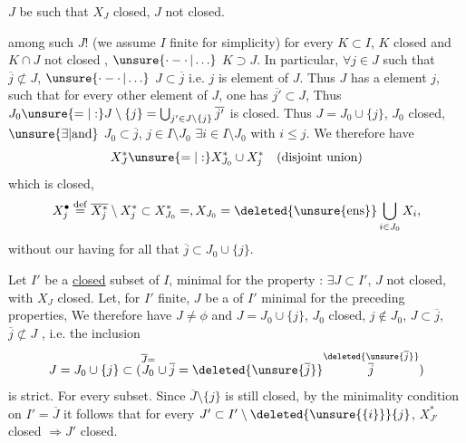   $J$ be such that $X_J$ closed, $J$ not closed. 

among such $J$! (we assume $I$ finite for simplicity) 
for every $K\subset I$, $K$ closed and $K\cap J$ not closed , $\unsure{\mathinner{\cdot-\cdot}|\ldots}$ $K\supset J$.
In particular, $\forall j\in J$ such that $\overline j\not\subset J$, $\unsure{\mathinner{\cdot-\cdot}|\ldots}$ $J\subset\overline j$
i.e. $j$ is  element of $J$. Thus $J$ has a 
element $j$, such that for every other element  of $J$, one has
$\overline{j'}\subset J$, Thus 
$J_0\unsure{=|:}J\setminus\{j\}=\bigcup_{j'\in J\setminus\{j\}}\overline{j'}$ is closed.
Thus $J=J_0\cup\{j\}$, $J_0$ closed, $\unsure{\exists|\mathrm{and}}$ $J_0\subset\overline j$, $j\in I\setminus J_0$
$\exists i\in I\setminus J_0$ with $i\leq j$.  We therefore have
\[
X_J^*\unsure{=|:}X_{J_0}^*\cup X_j^*\quad(\text{disjoint union})
\]
which is closed, 
\[
X_j^\bullet\overset{\mathrm{def}}=\overline{X_j^*}\setminus X_j^*\subset X_{J_0}^*=,X_{J_0}=\deleted{\unsure{\mathrm{ens}}}\bigcup_{i\in J_0}X_i,
\]
without our having
for all that $\overline j\subset J_0\cup\{j\}$.

Let $I'$ be a \uline{closed} subset of $I$, minimal for the
property : $\exists J\subset I'$, $J$ not closed, with $X_J$ closed. Let, for
$I'$ finite, $J$ be a  of $I'$ minimal for the preceding properties,
We therefore have $J\ne\phi$ and $J=J_0\cup\{j\}$, \deleted{$\unsure{\exists}$} $J_0$ closed, $j\notin J_0$,
 $J\subset\overline j$, $\overline j\not\subset J$ , i.e. the inclusion
\[
J=J_0\cup\{j\}\subset(\overset{\overline J=}{J_0}\cup\overline j=\deleted{\unsure{\overline j}}\overset{\deleted{\unsure{\overline j}}}{\overline j})
\]
is strict.  For every
subset. Since  $\overline J\setminus\{j\}$ is still closed, by the minimality
condition on $I'=\overline J$ it follows that for
 every $J'\subset I'\setminus\deleted{\unsure{\{i\}}}\{j\}$, $X_{J'}^*$ closed $\Rightarrow J'$ closed. 

